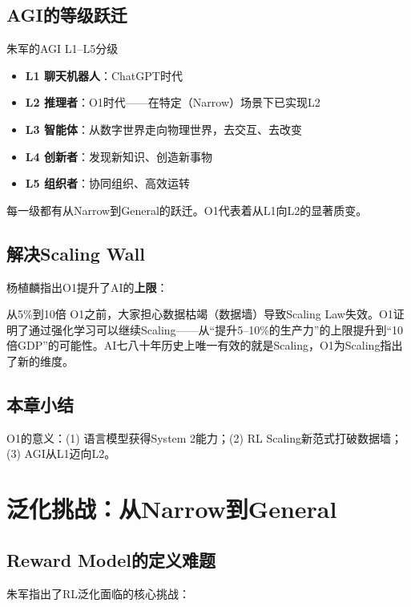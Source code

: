 \documentclass[a4paper]{article}
\begin{document}
\subsection{AGI的等级跃迁}

\begin{knowledgebox}{朱军的AGI L1--L5分级}
\begin{itemize}
\item \textbf{L1 聊天机器人}：ChatGPT时代
\item \textbf{L2 推理者}：O1时代——在特定（Narrow）场景下已实现L2
\item \textbf{L3 智能体}：从数字世界走向物理世界，去交互、去改变
\item \textbf{L4 创新者}：发现新知识、创造新事物
\item \textbf{L5 组织者}：协同组织、高效运转
\end{itemize}
每一级都有从Narrow到General的跃迁。O1代表着从L1向L2的显著质变。
\end{knowledgebox}

\subsection{解决Scaling Wall}

杨植麟指出O1提升了AI的\textbf{上限}：

\begin{importantbox}{从5\%到10倍}
O1之前，大家担心数据枯竭（数据墙）导致Scaling Law失效。O1证明了通过强化学习可以继续Scaling——从``提升5--10\%的生产力''的上限提升到``10倍GDP''的可能性。AI七八十年历史上唯一有效的就是Scaling，O1为Scaling指出了新的维度。
\end{importantbox}

\subsection{本章小结}

O1的意义：(1) 语言模型获得System 2能力；(2) RL Scaling新范式打破数据墙；(3) AGI从L1迈向L2。


\section{泛化挑战：从Narrow到General}

\subsection{Reward Model的定义难题}

朱军指出了RL泛化面临的核心挑战：
\end{document}
